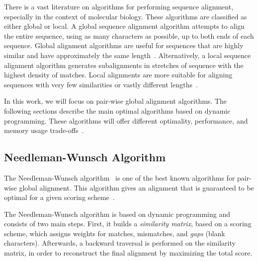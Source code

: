 There is a vast literature on algorithms for performing sequence alignment, especially in the context of molecular biology.
These algorithms are classified as either global or local.
A global sequence alignment algorithm attempts to align the entire sequence, using as many characters as possible, up to both ends of each sequence.
Global alignment algorithms are useful for sequences that are highly similar and have approximately the same length~\cite{mount05book}.
Alternatively, a local sequence alignment algorithm generates subalignments in stretches of sequence with the highest density of matches.
Local alignments are more suitable for aligning sequences with very few similarities or vastly different lengths~\cite{mount05book}.

In this work, we will focus on pair-wise global alignment algorithms.
The following sections describe the main optimal algorithms based on dynamic programming.
These algorithms will offer different optimality, performance, and memory usage trade-offs~\cite{needleman70,smith81,carrillo88,hickey11}.

\subsection{Needleman-Wunsch Algorithm}

The Needleman-Wunsch algorithm~\cite{needleman70} is one of the best known algorithms for pair-wise global alignment.
This algorithm gives an alignment that is guaranteed to be optimal for a given scoring scheme~\cite{higgins89}.

The Needleman-Wunsch algorithm is based on dynamic programming and consists of two main steps.
First, it builds a \textit{similarity matrix}, based on a scoring scheme, which assigns weights for matches, mismatches, and \textit{gaps} (blank characters).
Afterwards, a backward traversal is performed on the similarity matrix, in order to reconstruct the final alignment by maximizing the total score.

